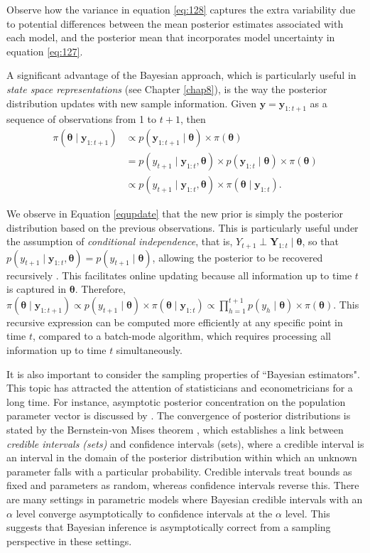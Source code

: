 Observe how the variance in equation \ref{eq:128} captures the extra variability due to potential differences between the mean posterior estimates associated with each model, and the posterior mean that incorporates model uncertainty in equation \ref{eq:127}.

A significant advantage of the Bayesian approach, which is particularly useful in \textit{state space representations} (see Chapter \ref{chap8}), is the way the posterior distribution updates with new sample information. Given $\mathbf{y} = \mathbf{y}_{1:t+1}$ as a sequence of observations from 1 to $t+1$, then
\begin{align}\label{equpdate}
	\pi(\bm{\theta}\mid \mathbf{y}_{1:t+1})&\propto p(\mathbf{y}_{1:t+1}\mid \bm{\theta})\times \pi(\bm{\theta})\nonumber\\
	&= p(y_{t+1}\mid \mathbf{y}_{1:t},\bm{\theta})\times p(\mathbf{y}_{1:t}\mid \bm{\theta})\times \pi(\bm{\theta})\nonumber\\
	&\propto p(y_{t+1}\mid \mathbf{y}_{1:t},\bm{\theta})\times \pi(\bm{\theta}\mid \mathbf{y}_{1:t}). 
\end{align}

We observe in Equation \ref{equpdate} that the new prior is simply the posterior distribution based on the previous observations. This is particularly useful under the assumption of \textit{conditional independence}, that is, $Y_{t+1} \perp \mathbf{Y}_{1:t} \mid \bm{\theta}$, so that $p(y_{t+1} \mid \mathbf{y}_{1:t}, \bm{\theta}) = p(y_{t+1} \mid \bm{\theta})$, allowing the posterior to be recovered recursively \cite{petris2009dynamic}. This facilitates online updating because all information up to time $t$ is captured in $\bm{\theta}$. Therefore, $\pi(\bm{\theta} \mid \mathbf{y}_{1:t+1}) \propto p(y_{t+1} \mid \bm{\theta}) \times \pi(\bm{\theta} \mid \mathbf{y}_{1:t}) \propto \prod_{h=1}^{t+1} p(y_h \mid \bm{\theta}) \times \pi(\bm{\theta})$. This recursive expression can be computed more efficiently at any specific point in time $t$, compared to a batch-mode algorithm, which requires processing all information up to time $t$ simultaneously.

It is also important to consider the sampling properties of ``Bayesian estimators". This topic has attracted the attention of statisticians and econometricians for a long time. For instance, asymptotic posterior concentration on the population parameter vector is discussed by \cite{bickel1969some}. The convergence of posterior distributions is stated by the Bernstein-von Mises theorem \cite{Lehmann2003,van2000asymptotic}, which establishes a link between \textit{credible intervals (sets)} and confidence intervals (sets), where a credible interval is an interval in the domain of the posterior distribution within which an unknown parameter falls with a particular probability. Credible intervals treat bounds as fixed and parameters as random, whereas confidence intervals reverse this. There are many settings in parametric models where Bayesian credible intervals with an $\alpha$ level converge asymptotically to confidence intervals at the $\alpha$ level. This suggests that Bayesian inference is asymptotically correct from a sampling perspective in these settings.

